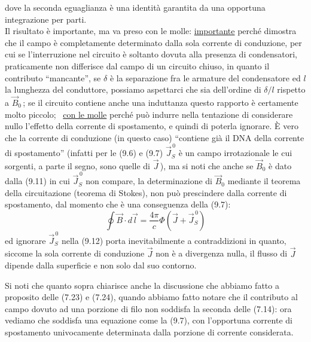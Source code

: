 dove la seconda eguaglianza \`e una identit\`a garantita da una opportuna
integrazione per parti.\\
Il risultato \`e importante, ma va preso con le molle: \underline{importante}
perch\'e dimostra che
il campo \`e completamente determinato dalla sola corrente di conduzione, per
cui se l'interruzione nel circuito \`e soltanto dovuta alla presenza di
condensatori, praticamente non differisce dal campo di un circuito chiuso, in
quanto il contributo ``mancante'', se $\delta$ \`e la separazione fra le
armature del condensatore ed $l$ la lunghezza del conduttore, possiamo
aspettarci che sia dell'ordine di $\delta/l$ rispetto a $\vec B_0$\,; se il
circuito contiene anche una induttanza questo rapporto \`e certamente molto
piccolo; \ \underline{con le molle} perch\'e pu\`o indurre nella tentazione di
considerare nullo l'effetto della corrente di spostamento, e quindi di poterla
ignorare. \`E vero che la corrente di conduzione (in questo caso) ``contiene
gi\`a il DNA della corrente di spostamento'' (infatti per le (9.6) e (9.7)
$\vec J_S^{\,0}$ \`e un campo irrotazionale le cui sorgenti, a parte il segno,
sono quelle di $\vec J$\,), ma si noti che anche se $\vec B_0$ \`e dato dalla
(9.11) in cui $\vec J_S^{\,0}$ non compare, la determinazione di $\vec B_0$
mediante il teorema della circuitazione (teorema di Stokes), non pu\`o
prescindere dalla corrente di spostamento, dal momento che \`e una conseguenza
della (9.7):
\begin{equation}
  \oint\vec B\cdot d\vec l=\frac{4\pi}{c}\Phi(\vec J+\vec J_S^{\,0})
  \tag{9.12}
\end{equation}
ed ignorare $\vec J_S^{\,0}$ nella (9.12) porta inevitabilmente a contraddizioni
in quanto, siccome la sola corrente di conduzione $\vec J$ non \`e a divergenza
nulla, il flusso di $\vec J$ dipende dalla superficie e non solo dal suo
contorno.

Si noti che quanto sopra chiarisce anche la discussione che abbiamo fatto a
proposito delle (7.23) e (7.24), quando abbiamo fatto notare che il contributo
al campo dovuto ad una porzione di filo non soddisfa la seconda delle (7.14):
ora vediamo che soddisfa una equazione come la (9.7), con l'opportuna corrente
di spostamento univocamente determinata dalla porzione di corrente considerata.

